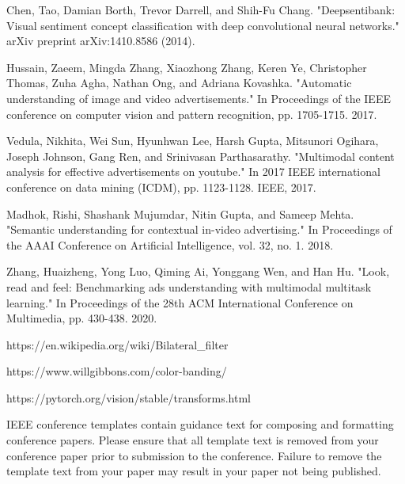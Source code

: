 \documentclass[conference]{IEEEtran}
\begin{document}
\begin{thebibliography}{00}
 Chen, Tao, Damian Borth, Trevor Darrell, and Shih-Fu Chang. "Deepsentibank: Visual sentiment concept classification with deep convolutional neural networks." arXiv preprint arXiv:1410.8586 (2014).

 Hussain, Zaeem, Mingda Zhang, Xiaozhong Zhang, Keren Ye, Christopher Thomas, Zuha Agha, Nathan Ong, and Adriana Kovashka. "Automatic understanding of image and video advertisements." In Proceedings of the IEEE conference on computer vision and pattern recognition, pp. 1705-1715. 2017.

 Vedula, Nikhita, Wei Sun, Hyunhwan Lee, Harsh Gupta, Mitsunori Ogihara, Joseph Johnson, Gang Ren, and Srinivasan Parthasarathy. "Multimodal content analysis for effective advertisements on youtube." In 2017 IEEE international conference on data mining (ICDM), pp. 1123-1128. IEEE, 2017.

 Madhok, Rishi, Shashank Mujumdar, Nitin Gupta, and Sameep Mehta. "Semantic understanding for contextual in-video advertising." In Proceedings of the AAAI Conference on Artificial Intelligence, vol. 32, no. 1. 2018.

 Zhang, Huaizheng, Yong Luo, Qiming Ai, Yonggang Wen, and Han Hu. "Look, read and feel: Benchmarking ads understanding with multimodal multitask learning." In Proceedings of the 28th ACM International Conference on Multimedia, pp. 430-438. 2020.

 https://en.wikipedia.org/wiki/Bilateral\_filter

 https://www.willgibbons.com/color-banding/

 https://pytorch.org/vision/stable/transforms.html

\end{thebibliography}
\vspace{12pt}
\color{red}
IEEE conference templates contain guidance text for composing and formatting conference papers. Please ensure that all template text is removed from your conference paper prior to submission to the conference. Failure to remove the template text from your paper may result in your paper not being published.
\end{document}
